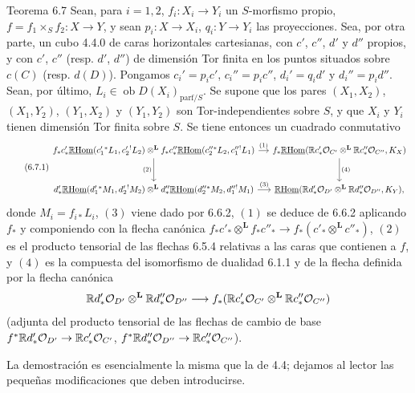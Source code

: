 \begin{statement}{Teorema 6.7}
Sean, para $i=1,2$, $f_i:X_i\to Y_i$ un $S$-morfismo propio, $f=f_1\times_Sf_2:X\to Y$, y sean $p_i:X\to X_i$, $q_i:Y\to Y_i$ las proyecciones. Sea, por otra parte, un cubo 4.4.0 de caras horizontales cartesianas, con $c'$, $c''$, $d'$ y $d''$ propios, y con $c'$, $c''$ (resp. $d'$, $d''$) de dimensión Tor finita en los puntos situados sobre $c(C)$ (resp. $d(D)$). Pongamos $c_i'=p_ic'$, $c_i''=p_ic''$, $d_i'=q_id'$ y $d_i''=p_id''$. Sean, por último, $L_i\in\operatorname{ob}D(X_i)_{\mathrm{parf}/S}$. Se supone que los pares $(X_1,X_2)$, $(X_1,Y_2)$, $(Y_1,X_2)$ y $(Y_1,Y_2)$ son Tor-independientes sobre $S$, y que $X_i$ y $Y_i$ tienen dimensión Tor finita sobre $S$. Se tiene entonces un cuadrado conmutativo
\begin{equation}
\tag{6.7.1}
\begin{tikzcd}[column sep=small,row sep=large]
f_*c'_*\uRHom(c_1'{}^*L_1,c_2'{}^!L_2)\otimes^{\mathbf L} f_*c''_*\uRHom(c_2''{}^*L_2,c_1''{}^!L_1) \arrow[r,"(1)"] \arrow[d,"(2)"']
& f_*\uRHom(\R c'_*\cO_{C'}\otimes^{\mathbf L}\R c''_*\cO_{C''},K_X) \arrow[d,"(4)"] \\
d'_*\uRHom(d_1'{}^*M_1,d_2'{}^!M_2)\otimes^{\mathbf L} d''_*\uRHom(d_2''{}^*M_2,d_1''{}^!M_1) \arrow[r,"(3)"]
& \uRHom(\R d'_*\cO_{D'}\otimes^{\mathbf L}\R d''_*\cO_{D''},K_Y),
\end{tikzcd}
\end{equation}
donde $M_i=f_{i*}L_i$, $(3)$ viene dado por 6.6.2, $(1)$ se deduce de 6.6.2 aplicando $f_*$ y componiendo con la flecha canónica $f_*c'_*\otimes^{\mathbf L} f_*c''_*\to f_*(c'_*\otimes^{\mathbf L} c''_*)$, $(2)$ es el producto tensorial de las flechas 6.5.4 relativas a las caras que contienen a $f$, y $(4)$ es la compuesta del isomorfismo de dualidad 6.1.1 y de la flecha definida por la flecha canónica
\[
\mathbb{R} d'_*\mathcal{O}_{D'}\otimes^{\mathbf L}\mathbb{R} d''_*\mathcal{O}_{D''}\longrightarrow f_*(\mathbb{R} c'_*\mathcal{O}_{C'}\otimes^{\mathbf L}\mathbb{R} c''_*\mathcal{O}_{C''})
\]
(adjunta del producto tensorial de las flechas de cambio de base $f^*\mathbb{R} d'_*\mathcal{O}_{D'}\to \mathbb{R} c'_*\mathcal{O}_{C'}$, $f^*\mathbb{R} d''_*\mathcal{O}_{D''}\to \mathbb{R} c''_*\mathcal{O}_{C''}$).
\end{statement}

La demostración es esencialmente la misma que la de 4.4; dejamos al lector las pequeñas modificaciones que deben introducirse.

